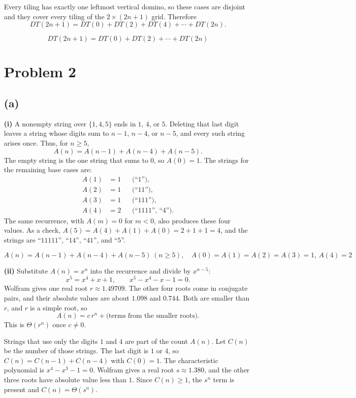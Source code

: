 \documentclass[11pt]{article}
\begin{document}
Every tiling has exactly one leftmost vertical domino, so these cases are disjoint and they cover every tiling of the $2\times(2n+1)$ grid. Therefore
\[
DT(2n+1)=DT(0)+DT(2)+DT(4)+\cdots+DT(2n).
\]

\[
\boxed{DT(2n+1)=DT(0)+DT(2)+\cdots+DT(2n)}
\]

\section*{Problem 2}

\subsection*{(a)}

\textbf{(i)}
A nonempty string over $\{1,4,5\}$ ends in $1$, $4$, or $5$. Deleting that last digit leaves a string whose digits sum to $n-1$, $n-4$, or $n-5$, and every such string arises once. Thus, for $n\ge 5$,
\[
A(n)=A(n-1)+A(n-4)+A(n-5).
\]
The empty string is the one string that sums to $0$, so $A(0)=1$. The strings for the remaining base cases are:
\begin{align*}
A(1)&=1 &&\text{(``$1$'')},\\
A(2)&=1 &&\text{(``$11$'')},\\
A(3)&=1 &&\text{(``$111$'')},\\
A(4)&=2 &&\text{(``$1111$'', ``$4$'')}.
\end{align*}
The same recurrence, with $A(m)=0$ for $m<0$, also produces these four values. As a check, $A(5)=A(4)+A(1)+A(0)=2+1+1=4$, and the strings are ``$11111$'', ``$14$'', ``$41$'', and ``$5$''.

\[
\boxed{A(n)=A(n-1)+A(n-4)+A(n-5)\ (n\ge 5),
\quad A(0)=A(1)=A(2)=A(3)=1,\ A(4)=2}
\]

\textbf{(ii)}
Substitute $A(n)=x^{n}$ into the recurrence and divide by $x^{n-5}$:
\[
x^{5}=x^{4}+x+1, \qquad x^{5}-x^{4}-x-1=0.
\]
Wolfram gives one real root $r\approx 1.49709$. The other four roots come in conjugate pairs, and their absolute values are about $1.098$ and $0.744$. Both are smaller than $r$, and $r$ is a simple root, so
\[
A(n)=c\,r^{n}+\text{(terms from the smaller roots)}.
\]
This is $\Theta(r^{n})$ once $c\neq 0$.

Strings that use only the digits $1$ and $4$ are part of the count $A(n)$. Let $C(n)$ be the number of those strings. The last digit is $1$ or $4$, so $C(n)=C(n-1)+C(n-4)$ with $C(0)=1$. The characteristic polynomial is $x^{4}-x^{3}-1=0$. Wolfram gives a real root $s\approx 1.380$, and the other three roots have absolute value less than $1$. Since $C(n)\ge 1$, the $s^{n}$ term is present and $C(n)=\Theta(s^{n})$.
\end{document}
